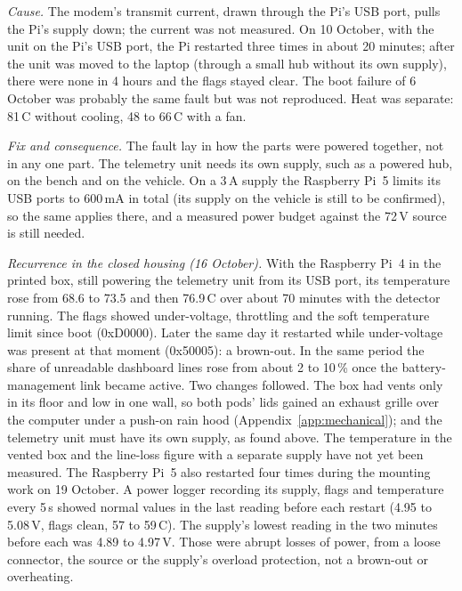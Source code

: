 \emph{Cause.} The modem's transmit current, drawn through the Pi's USB port, pulls the Pi's supply down; the current was not measured. On 10 October, with the unit on the Pi's USB port, the Pi restarted three times in about 20 minutes; after the unit was moved to the laptop (through a small hub without its own supply), there were none in 4 hours and the flags stayed clear. The boot failure of 6 October was probably the same fault but was not reproduced. Heat was separate: 81\,\textdegree C without cooling, 48 to 66\,\textdegree C with a fan.

\emph{Fix and consequence.} The fault lay in how the parts were powered together, not in any one part. The telemetry unit needs its own supply, such as a powered hub, on the bench and on the vehicle. On a 3\,A supply the Raspberry Pi~5 limits its USB ports to 600\,mA in total (its supply on the vehicle is still to be confirmed), so the same applies there, and a measured power budget against the 72\,V source is still needed.

\emph{Recurrence in the closed housing (16 October).} With the Raspberry Pi~4 in the printed box, still powering the telemetry unit from its USB port, its temperature rose from 68.6 to 73.5 and then 76.9\,\textdegree C over about 70 minutes with the detector running. The flags showed under-voltage, throttling and the soft temperature limit since boot (0xD0000). Later the same day it restarted while under-voltage was present at that moment (0x50005): a brown-out. In the same period the share of unreadable dashboard lines rose from about 2 to 10\,\% once the battery-management link became active. Two changes followed. The box had vents only in its floor and low in one wall, so both pods' lids gained an exhaust grille over the computer under a push-on rain hood (Appendix~\ref{app:mechanical}); and the telemetry unit must have its own supply, as found above. The temperature in the vented box and the line-loss figure with a separate supply have not yet been measured. The Raspberry Pi~5 also restarted four times during the mounting work on 19 October. A power logger recording its supply, flags and temperature every 5\,s showed normal values in the last reading before each restart (4.95 to 5.08\,V, flags clean, 57 to 59\,\textdegree C). The supply's lowest reading in the two minutes before each was 4.89 to 4.97\,V. Those were abrupt losses of power, from a loose connector, the source or the supply's overload protection, not a brown-out or overheating.

